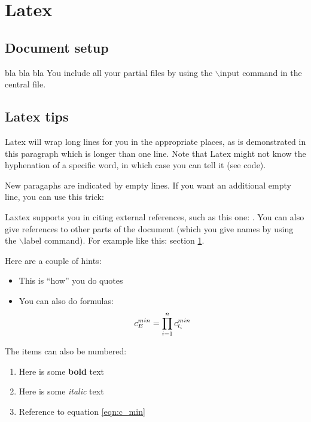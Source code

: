 \chapter{Latex}
\label{sec:introduction:related.work}

\section{Document setup}

bla bla bla
You include all your partial files by using the $\backslash$input command in the central file.

\section{Latex tips}


Latex will wrap long lines for you in the appropriate places, as is demonstrated in this paragraph which is longer than one line. Note that Latex might not know the hyphenation of a specific word, in which case you can tell it (see code).

New paragaphs are indicated by empty lines. If you want an additional empty line, you can use this trick:

\null

Laxtex supports you in citing external references, such as this one: \cite{examplecitation}.
You can also give references to other parts of the document (which you give names by using the $\backslash$label command). For example like this: section \ref{sec:introduction:related.work}.

 Here are a couple of hints:
\begin{itemize}
\item This is ``how'' you do quotes
\item You can also do formulas:
\begin{equation}
\label{eqn:c_min}
c^{min}_{E}=\prod_{i=1}^{n}{c^{min}_{l_i}}\\
\end{equation}
\end{itemize}

The items can also be numbered:
\begin{enumerate}
\item Here is some \textbf{bold} text
\item Here is some \textit{italic} text
\item Reference to equation \ref{eqn:c_min}
\end{enumerate}

